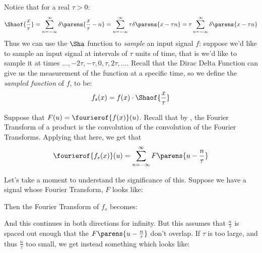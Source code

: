 \documentclass[10pt]{article}
\begin{document}
Notice that for a real $\tau>0$:
\[ \Shaof{\frac x\tau} = \sum_{n=-\infty}^\infty \delta\parens{\frac x\tau -n} = \sum_{n=-\infty}^\infty \tau\delta\parens{x-\tau n} = \tau\sum_{n=-\infty}^\infty\delta\parens{x-\tau n} \]
Thus we can use the $\Sha$ function to \emph{sample} an input signal $f$: suppose we'd like to sample an input signal at intervals of $\tau$ units of time, that is we'd like to sample it at
times $\dots, -2\tau, -\tau, 0, \tau, 2\tau, \dots$.
Recall that the Dirac Delta Function can give us the measurement of the function at a specific time, so we define the \emph{sampled function} of $f$, to be:
\[ f_s(x) = f(x)\cdot\Shaof{\frac x\tau} \]

Suppose that $F(u)=\fourierof{f(x)}(u)$.
Recall that by , the Fourier Transform of a product is the convolution of the convolution of the Fourier Transforms.
Applying that here, we get that
\[ \fourierof{f_s(x)}(u) = \sum_{n=-\infty}^\infty F\parens{u-\frac n\tau} \]

Let's take a moment to understand the significance of this.
Suppose we have a signal whose Fourier Transform, $F$ looks like:

{\centering{}\par}

Then the Fourier Transform of $f_s$ becomes:

{\centering{}\par}

And this continues in both directions for infinity.
But this assumes that $\frac n\tau$ is spaced out enough that the $F\parens{u-\frac n\tau}$ don't overlap.
If $\tau$ is too large, and thus $\frac n\tau$ too small, we get instead something which looks like:
\end{document}
